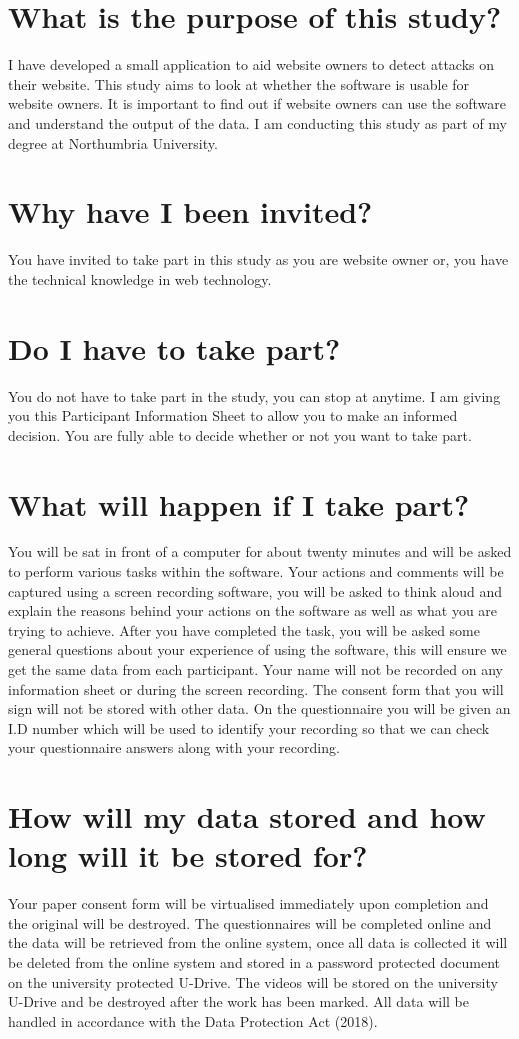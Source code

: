 
\section{What is the purpose of this study?}
I have developed a small application to aid website owners to detect attacks on their website. This study aims to look at whether the software is usable for website owners. It is important to find out if website owners can use the software and understand the output of the data. I am conducting this study as part of my degree at Northumbria University. 
\section{Why have I been invited?}
You have invited to take part in this study as you are website owner or, you have the technical knowledge in web technology. 
\section{Do I have to take part?}
You do not have to take part in the study, you can stop at anytime. I am giving you this Participant Information Sheet to allow you to make an informed decision. You are fully able to decide whether or not you want to take part. 

\section{What will happen if I take part?}
You will be sat in front of a computer for about twenty minutes and will be asked to perform various tasks within the software. Your actions and comments will be captured using a screen recording software, you will be asked to think aloud and explain the reasons behind your actions on the software as well as what you are trying to achieve. After you have completed the task, you will be asked some general questions about your experience of using the software, this will ensure we get the same data from each participant. Your name will not be recorded on any information sheet or during the screen recording. The consent form that you will sign will not be stored with other data. On the questionnaire you will be given an I.D number which will be used to identify your recording so that we can check your questionnaire answers along with your recording. 
\section{How will my data stored and how long will it be stored for?}
Your paper consent form will be virtualised immediately upon completion and the original will be destroyed. The questionnaires will be completed online and the data will be retrieved from the online system, once all data is collected it will be deleted from the online system and stored in a password protected document on the university protected U-Drive. The videos will be stored on the university U-Drive and be destroyed after the work has been marked.  All data will be handled in accordance with the Data Protection Act (2018).
